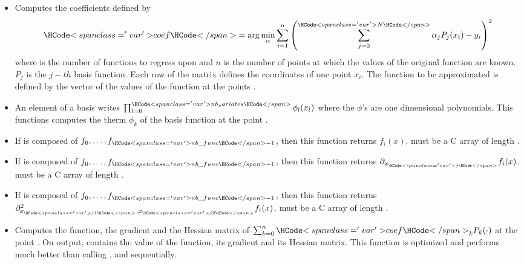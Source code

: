 \begin{itemize}
\item {}
  \sshortdescribe Computes the coefficients  defined by
  \begin{equation*}
    \var{coef} = \arg\min_\alpha \sum_{i=1}^n
    \left( \sum_{j=0}^{\var{N}} \alpha_j  P_j(x_i) - y_i\right)^2
  \end{equation*}
  where  is the number of functions to regress upon and $n$ is the number
  of points at which the values of the original function are known. $P_j$ is the
  $j-th$ basis function. Each row of the matrix  defines the coordinates
  of one point $x_i$. The function to be approximated is defined by the vector
   of the values of the function at the points .

\item {}
  \sshortdescribe An element of a basis writes $\prod_{l=0}^{\var{nb_variates}}
  \phi_l(x_l)$ where the $\phi$'s are one dimensional polynomials. This
  functions computes the therm $\phi_k$ of the  basis function at the
  point .
\item  {}
  \sshortdescribe If  is composed of $f_0, \dots, f_{\var{nb\_func}-1}$,
  then this function returns $f_i(x)$.  must be a C array of length
  .

\item {}
  \sshortdescribe If  is composed of $f_0, \dots, f_{\var{nb\_func}-1}$,
  then this function returns $\partial_{x_{\var{j}}} f_i(x)$.  must be a C array
  of length .

  
\item {}
  \sshortdescribe If  is composed of $f_0, \dots, f_{\var{nb\_func}-1}$,
  then this function returns $\partial^2_{x_{\var{j1}}, x_{\var{j2}}}
  f_i(x)$.  must be a C array of length .


\item {}
  \sshortdescribe Computes the function, the gradient and the Hessian matrix
  of $\sum_{k=0}^n \var{coef}_k  P_k(\cdot)$ at the point .
  On output,  contains the value of the function,  its
  gradient and  its Hessian matrix. This function is optimized and
  performs much better than calling ,
   and  sequentially.


\end{itemize}
